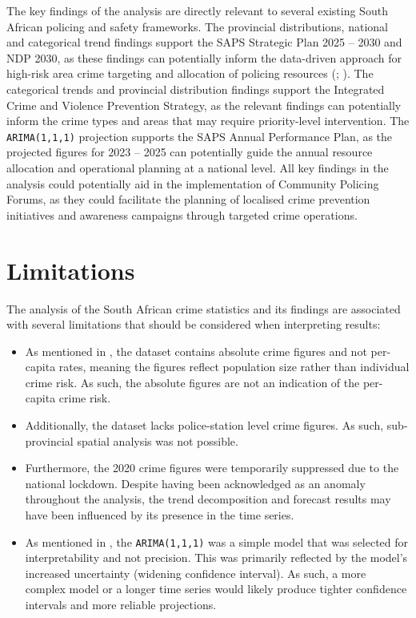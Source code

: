 \documentclass[titlepage, 12pt, oneside]{article}
\numberwithin{equation}{section}
\begin{document}
	\vspace{\fill}
	\noindent The key findings of the analysis are directly relevant to several existing South African policing and safety frameworks. The provincial distributions, national and categorical trend findings support the SAPS Strategic Plan 2025 -- 2030 and NDP 2030, as these findings can potentially inform the data-driven approach for high-risk area crime targeting and allocation of policing resources (\cite{ndp2030}; \cite{saps2025}). The categorical trends and provincial distribution findings support the Integrated Crime and Violence Prevention Strategy, as the relevant findings can potentially inform the crime types and areas that may require priority-level intervention. The \texttt{ARIMA(1,1,1)} projection supports the SAPS Annual Performance Plan, as the projected figures for 2023 -- 2025 can potentially guide the annual resource allocation and operational planning at a national level. All key findings in the analysis could potentially aid in the implementation of Community Policing Forums, as they could facilitate the planning of localised crime prevention initiatives and awareness campaigns through targeted crime operations.  
	\vspace{\fill}

    \newpage
	\section{Limitations}
    The analysis of the South African crime statistics and its findings are associated with several limitations that should be considered when interpreting results:
    
    \begin{itemize}
    	\item As mentioned in , the dataset contains absolute crime figures and not per-capita rates, meaning the figures reflect population size rather than individual crime risk. As such, the absolute figures are not an indication of the per-capita crime risk. 
    	\item Additionally, the dataset lacks police-station level crime figures. As such, sub-provincial spatial analysis was not possible. 
    	\item Furthermore, the 2020 crime figures were temporarily suppressed due to the national lockdown. Despite having been acknowledged as an anomaly throughout the analysis, the trend decomposition and forecast results may have been influenced by its presence in the time series. 
    	\item As mentioned in , the \texttt{ARIMA(1,1,1)} was a simple model that was selected for interpretability and not precision. This was primarily reflected by the model's increased uncertainty (widening confidence interval). As such, a more complex model or a longer time series would likely produce tighter confidence intervals and more reliable projections. 
    \end{itemize}
	
\end{document}
